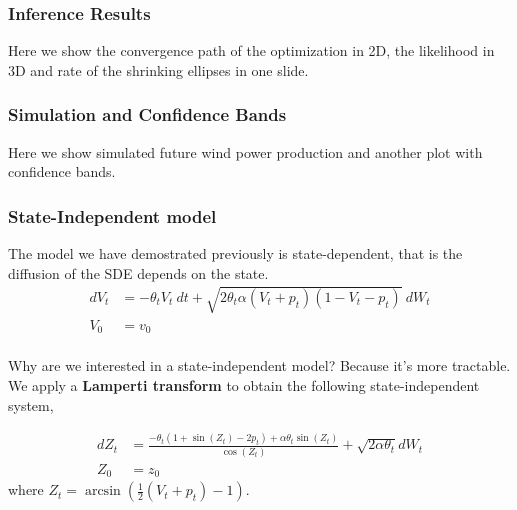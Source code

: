 \documentclass[aspectratio=169]{beamer}\usepackage[utf8]{inputenc}
\begin{document}
\begin{frame}\frametitle{Inference Results}
Here we show the convergence path of the optimization in 2D, the likelihood in 3D and rate of the shrinking ellipses in one slide.
\end{frame}

\begin{frame}\frametitle{Simulation and Confidence Bands}
Here we show simulated future wind power production and another plot with confidence bands.
\end{frame}

\begin{frame}\frametitle{State-Independent model}
The model we have demostrated previously is state-dependent, that is the diffusion of the SDE depends on the state.
\begin{equation}
\begin{split}
dV_t &=  - \theta_t V_t \  dt + \sqrt{2 \theta_t \alpha (V_t +p_t ) (1-V_t-p_t)} \  dW_t  \\ %
V_0 & = v_0\\
\end{split}\label{VtSDE}
\end{equation}

Why are we interested in a state-independent model? Because it's more tractable.\\
We apply a \textbf{Lamperti transform} to obtain the following state-independent system,

\begin{equation}
  \begin{split}
    dZ_t&= \frac{- \theta_t (1+ \sin(Z_t) - 2p_t) + \alpha \theta_t \sin (Z_t)   }{\cos (Z_t)} + \sqrt{2 \alpha \theta_t} dW_t \\
    Z_0&=z_0
  \end{split}
\end{equation}
where $Z_t = \arcsin \left( \frac{1}{2} \left( V_t+p_t \right) - 1 \right) $.
\end{frame}
\end{document}
